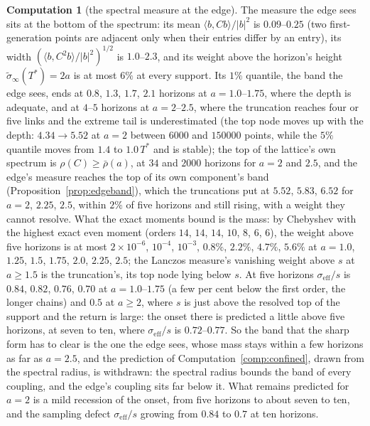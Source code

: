 \documentclass[11pt]{article}
\theoremstyle{definition}
\newtheorem{computation}[theorem]{Computation}
\theoremstyle{remark}
\newcommand{\Tst}{T^{*}}
\begin{document}
\begin{computation}[the spectral measure at the edge]
The measure the edge sees sits at the bottom of the spectrum: its mean $\langle b,Cb\rangle/|b|^2$ is $0.09$--$0.25$ (two first-generation points are adjacent only when their entries differ by an entry), its width $(\langle b,C^2b\rangle/|b|^2)^{1/2}$ is $1.0$--$2.3$, and its weight above the horizon's height $\tilde\sigma_\infty(\Tst)=2a$ is at most $6\%$ at every support. Its $1\%$ quantile, the band the edge sees, ends at $0.8$, $1.3$, $1.7$, $2.1$ horizons at $a=1.0$--$1.75$, where the depth is adequate, and at $4$--$5$ horizons at $a=2$--$2.5$, where the truncation reaches four or five links and the extreme tail is underestimated (the top node moves up with the depth: $4.34\to5.52$ at $a=2$ between $6000$ and $150000$ points, while the $5\%$ quantile moves from $1.4$ to $1.0\,\Tst$ and is stable); the top of the lattice's own spectrum is $\rho(C)\ge\bar\rho(a)$, at $34$ and $2000$ horizons for $a=2$ and $2.5$, and the edge's measure reaches the top of its own component's band (Proposition~\ref{prop:edgeband}), which the truncations put at $5.52$, $5.83$, $6.52$ for $a=2$, $2.25$, $2.5$, within $2\%$ of five horizons and still rising, with a weight they cannot resolve. What the exact moments bound is the mass: by Chebyshev with the highest exact even moment (orders $14$, $14$, $14$, $10$, $8$, $6$, $6$), the weight above five horizons is at most $2\times10^{-6}$, $10^{-4}$, $10^{-3}$, $0.8\%$, $2.2\%$, $4.7\%$, $5.6\%$ at $a=1.0$, $1.25$, $1.5$, $1.75$, $2.0$, $2.25$, $2.5$; the Lanczos measure's vanishing weight above $s$ at $a\ge1.5$ is the truncation's, its top node lying below $s$. At five horizons $\sigma_{\mathrm{eff}}/s$ is $0.84$, $0.82$, $0.76$, $0.70$ at $a=1.0$--$1.75$ (a few per cent below the first order, the longer chains) and $0.5$ at $a\ge2$, where $s$ is just above the resolved top of the support and the return is large: the onset there is predicted a little above five horizons, at seven to ten, where $\sigma_{\mathrm{eff}}/s$ is $0.72$--$0.77$. So the band that the sharp form has to clear is the one the edge sees, whose mass stays within a few horizons as far as $a=2.5$, and the prediction of Computation~\ref{comp:confined}, drawn from the spectral radius, is withdrawn: the spectral radius bounds the band of every coupling, and the edge's coupling sits far below it. What remains predicted for $a=2$ is a mild recession of the onset, from five horizons to about seven to ten, and the sampling defect $\sigma_{\mathrm{eff}}/s$ growing from $0.84$ to $0.7$ at ten horizons.
\end{computation}
\end{document}
